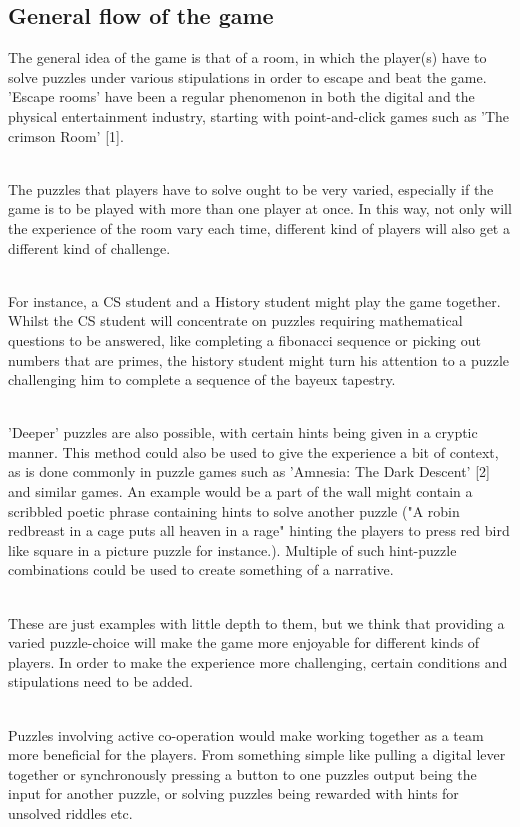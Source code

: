 \documentclass[11pt]{article}
\begin{document}
\subsection*{General flow of the game}
The general idea of the game is that of a room, in which the player(s) have to solve puzzles under various stipulations in order to escape and beat the game. 'Escape rooms' have been a regular phenomenon in both the digital and the physical entertainment industry, starting with point-and-click games such as 'The crimson Room' [1].


~\\
The puzzles that players have to solve ought to be very varied, especially if the game is to be played with more than one player at once. In this way, not only will the experience of the room vary each time, different kind of players will also get a different kind of challenge. 

~\\
For instance, a CS student and a History student might play the game together. Whilst the CS student will concentrate on puzzles requiring mathematical questions to be answered, like completing a fibonacci sequence or picking out numbers that are primes, the history student might turn his attention to a puzzle challenging him to complete a sequence of the bayeux tapestry.

~\\
 'Deeper' puzzles are also possible, with certain hints being given in a cryptic manner. This method could also be used to give the experience a bit of context, as is done commonly in puzzle games such as 'Amnesia: The Dark Descent' [2] and similar games.  An example would be a part of the wall might contain a scribbled poetic phrase containing hints to solve another puzzle ("A robin redbreast in a cage puts all heaven in a rage" hinting the players to press red bird like square in a picture puzzle for instance.). Multiple of such hint-puzzle combinations could be used to create something of a narrative. 

~\\
These are just examples with little depth to them, but we think that providing a varied puzzle-choice will make the game more enjoyable for different kinds of players. In order to make the experience more challenging, certain conditions and stipulations need to be added. 

~\\
Puzzles involving active co-operation would make working together as a team more beneficial for the players. From something simple like pulling a digital lever together or synchronously pressing a button to one puzzles output being the input for another puzzle, or solving puzzles being rewarded with hints for unsolved riddles etc. 
\end{document}
